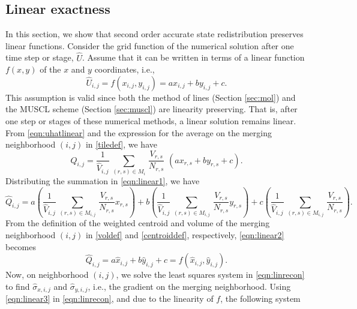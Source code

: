 \subsection{Linear exactness} \label{sec:linex}
In this section, we show that second order accurate state redistribution preserves linear functions.
Consider the grid function of the numerical solution after one time step
or stage, $\widehat{U}$.  Assume that it can be written in terms of a linear function $f(x,y)$ of the $x$ and $y$ coordinates, i.e.,
\begin{equation}
    \label{eqn:uhatlinear}
\widehat{U}_{i,j} = f(x_{i,j},y_{i,j}) = ax_{i,j} + by_{i,j} + c.
\end{equation}
This assumption is valid since both the method of lines (Section \ref{sec:mol}) and the MUSCL scheme (Section \ref{sec:muscl}) are linearity preserving.  That is, after one step or stages of these numerical methods, a linear solution remains linear.
From \eqref{eqn:uhatlinear} and the expression for the average on the merging neighborhood $(i,j)$ in \eqref{tiledef}, we have
\begin{equation}
    \label{eqn:linear1}
\widehat{Q}_{i,j} = \frac{1}{{\widehat V}_{i,j}} \, \sum_{(r,s) \in M_i} \,  
\frac{V_{r,s}}{N_{r,s}}  \,\, (ax_{r,s} + by_{r,s} + c).
\end{equation}
Distributing the summation in \eqref{eqn:linear1}, we have
\begin{equation}\label{eqn:linear2}
\widehat{Q}_{i,j} =  a \left(\frac{1}{{\widehat V}_{i,j}} \, \sum_{(r,s) \in M_{i,j}} \,  
\frac{V_{r,s}}{N_{r,s}} x_{r,s} \right) + b\left(\frac{1}{{\widehat V}_{i,j}} \, \sum_{(r,s) \in M_{i,j}} \,  
\frac{V_{r,s}}{N_{r,s}} y_{r,s} \right) + c\left(\frac{1}{{\widehat V}_{i,j}} \, \sum_{(r,s) \in M_{i,j}} \,
\frac{V_{r,s}}{N_{r,s}}\right) .
\end{equation}
From the definition of the weighted centroid and volume of the merging neighborhood
$(i,j)$ in \eqref{voldef} and \eqref{centroiddef}, respectively, \eqref{eqn:linear2} becomes
\begin{equation}\label{eqn:linear3}
\widehat{Q}_{i,j} =  a \widehat{x}_{i,j} + b\widehat{y}_{i,j} + c = f(\widehat{x}_{i,j},\widehat{y}_{i,j}).
\end{equation}
Now, on neighborhood $(i,j)$, we solve the least squares system in
\eqref{eqn:linrecon} to find $\widehat{\sigma}_{x,i,j}$ and
$\widehat{\sigma}_{y,i,j}$, i.e., the gradient on the merging neighborhood.  Using
\eqref{eqn:linear3} in \eqref{eqn:linrecon}, and due to the linearity of $f$, the following system

